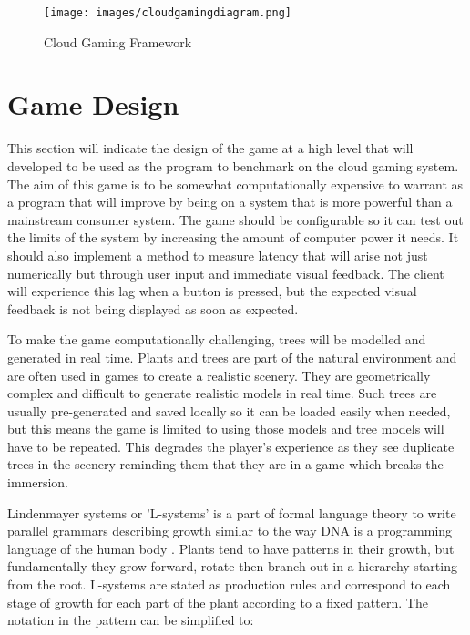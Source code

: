 \clearpage
\begin{figure}[h!]
 \centering
 \texttt{[image: images/cloudgamingdiagram.png]}
 \caption{Cloud Gaming Framework \cite{chuah2014cloud}}
 \label{fig:cloudframework}
\end{figure}

\section{Game Design}
This section will indicate the design of the game at a high level that will developed to be used as the program to benchmark on the cloud gaming system. The aim of this game is to be somewhat computationally expensive to warrant as a program that will improve by being on a system that is more powerful than a mainstream consumer system. The game should be configurable so it can test out the limits of the system by increasing the amount of computer power it needs. It should also implement a method to measure latency that will arise not just numerically but through user input and immediate visual feedback. The client will experience this lag when a button is pressed, but the expected visual feedback is not being displayed as soon as expected.
\newline
\par
To make the game computationally challenging, trees will be modelled and generated in real time. Plants and trees are part of the natural environment and are often used in games to create a realistic scenery. They are geometrically complex and difficult to generate realistic models in real time. Such trees are usually pre-generated and saved locally so it can be loaded easily when needed, but this means the game is limited to using those models and tree models will have to be repeated. This degrades the player's experience as they see duplicate trees in the scenery reminding them that they are in a game which breaks the immersion.
\newline
\par
Lindenmayer systems or 'L-systems' is a part of formal language theory to write parallel grammars describing growth similar to the way DNA is a programming language of the human body \cite{prusinkiewicz2012algorithmic}. Plants tend to have patterns in their growth, but fundamentally they grow forward, rotate then branch out in a hierarchy starting from the root. L-systems are stated as production rules and correspond to each stage of growth for each part of the plant according to a fixed pattern. The notation in the pattern can be simplified to:
